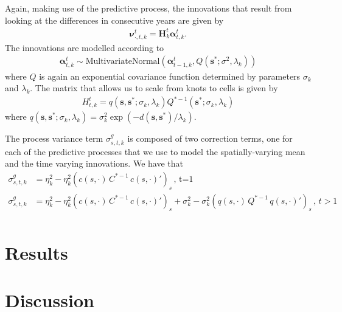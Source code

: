\documentclass[12pt]{article}
\begin{document}
Again, making use of the predictive process, the innovations that result from looking at the differences
in consecutive years are given by
\begin{align*}
\bm{\nu}_{\cdot, t, k}^t = \bm{H}_k^t \bm{\alpha}_{t,k}^t.
\end{align*}
The innovations are modelled according to
\begin{align*}
\bm{\alpha}^t_{t,k} \sim \text{MultivariateNormal}(\bm{\alpha}^t_{t-1,k}, Q(\bm{s^*}; \sigma^2, \lambda_k))
\end{align*}
where $Q$ is again an exponential covariance function determined by
parameters $\sigma_k$ and $\lambda_k$. The matrix that allows us to
scale from knots to cells is given by
\begin{align*}
H^t_{t,k} =  q(\bm{s}, \bm{s^*}; \sigma_k, \lambda_k) Q^{*-1}(\bm{s^*}; \sigma_k, \lambda_k)
\end{align*}
where $q(\bm{s}, \bm{s^*}; \sigma_k, \lambda_k) = \sigma_k^2 \exp( -d(\bm{s},\bm{s^*}) / \lambda_k)$.

The process variance term $\sigma^g_{s,t,k}$ is composed of two
correction terms, one for each of the predictive processes that we use
to model the spatially-varying mean and the time varying
innovations. We have that
\begin{align*}
\sigma^g_{s,t,k} &= \eta_k^2 - \eta_k^2 (c(s, \cdot) \, C^{*-1} \, c(s, \cdot)')_{s} \, , \, \text{t=1} \\
\sigma^g_{s,t,k} &= \eta_k^2 - \eta_k^2 (c(s, \cdot) \, C^{*-1} \, c(s, \cdot)')_{s} + \sigma_k^2 - \sigma_k^2(q(s, \cdot) \,  Q^{*-1} \, q(s, \cdot)')_{s} \, , \, t > 1 \\
\end{align*}

\section{Results}

\section{Discussion}
\end{document}

